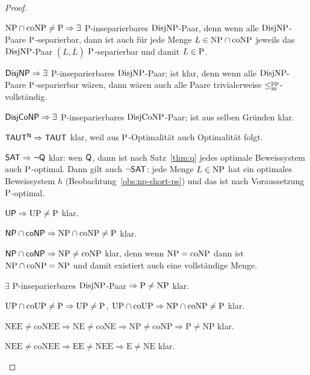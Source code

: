 \begin{proof}
\begin{Prooflist}[noitemsep,midpenalty=0, label={\arabic*.},labelsep=3pt]
\item $\NP\cap\coNP\neq \P \Rightarrow\exists$ P-inseparierbares $\DisjNP$-Paar, denn wenn alle $\DisjNP$-Paare $\P$-separierbar, dann ist auch für jede Menge $L\in\NP\cap\coNP$ jeweils das $\DisjNP$-Paar $(L,\overline{L})$ $\P$-separierbar und damit $L\in\P$.
\item $\hDisjNP \Rightarrow \exists$ P-inseparierbares $\DisjNP$-Paar; ist klar, denn wenn alle $\DisjNP$-Paare $\P$-separierbar wären, dann wären auch alle Paare trivialerweise $\leqmpp$-vollständig.
\item $\hDisjCoNP \Rightarrow \exists$ P-inseparierbares $\DisjCoNP$-Paar; ist aus selben Gründen klar.
\item $\mathsf{TAUT^N} \Rightarrow \hTAUT$ klar, weil aus $\P$-Optimalität auch Optimalität folgt.
\item $\mathsf \hSAT \Rightarrow \neg\hQ $ klar: wen $\hQ$, dann ist nach Satz~\ref{thm:q} jedes optimale Beweissystem auch $\P$-optimal. Dann gilt auch $\neg\hSAT$: jede Menge $L\in\NP$ hat ein optimales Beweissystem $h$ (Beobachtung~\ref{obs:np-short-ps}) und das ist nach Voraussetzung $\P$-optimal.
\item $\hUP \Rightarrow \UP\neq\P$ klar.
\item $\hNPcoNP \Rightarrow \NP\cap\coNP\neq \P$ klar.
\item $\hNPcoNP \Rightarrow \NP\neq\coNP$ klar, denn wenn $\NP=\coNP$ dann ist $\NP\cap\coNP=\NP$ und damit existiert auch eine vollständige Menge.
\item $\exists$ P-inseparierbares $\DisjNP$-Paar $\Rightarrow \P\neq \NP$ klar.
\item $\UP\cap\coUP\neq\P \Rightarrow \UP\neq \P$, $\UP\cap\coUP\Rightarrow \NP\cap\coNP\neq\P$ klar.
\item $\mathrm{NEE\neq coNEE \Rightarrow NE \neq coNE \Rightarrow NP \neq coNP \Rightarrow P\neq NP}$ klar.
\item $\mathrm{NEE\neq coNEE \Rightarrow EE \neq NEE \Rightarrow E\neq NE}$ klar.\qedhere
\end{Prooflist}
\end{proof}

